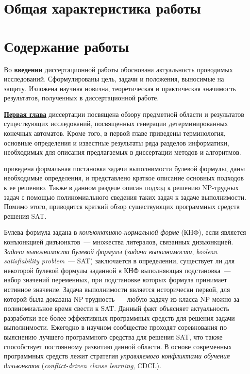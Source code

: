 
\section*{Общая характеристика работы} %



\newpage

\section*{Содержание работы}

Во \textbf{введении} диссертационной работы обоснована актуальность проводимых исследований. Сформулированы цель, задачи и положения, выносимые на защиту. Изложена научная новизна, теоретическая и практическая значимость результатов, полученных в диссертационной работе.

\textbf{\underline{Первая глава}} диссертации посвящена обзору предметной области и результатов существующих исследований, посвященных генерации детерминированных конечных автоматов.
Кроме того, в первой главе приведены терминология, основные определения и известные результаты ряда разделов информатики, необходимых для описания предлагаемых в диссертации методов и алгоритмов.

\insection{\ref{sec:review:sat}} приведена формальная постановка задачи выполнимости булевой формулы, даны необходимые определения, и представлено краткое описание основных подходов к ее решению.
Также в данном разделе описан подход к решению NP-трудных задач с помощью полиномиального сведения таких задач к задаче выполнимости.
Помимо этого, приводится краткий обзор существующих программных средств решения SAT.

Булева формула задана в \emph{конъюнктивно-нормальной форме} (КНФ), если является конъюнкцией дизъюнктов~--- множества литералов, связанных дизъюнкцией.
\emph{Задача выполнимости булевой формулы} (\emph{задача выполнимости}, \emph{boolean satisfiability problem}~{---} SAT) заключается в определении, существует ли для некоторой булевой формулы заданной в КНФ выполняющая подстановка~--- набор значений переменных, при подстановке которых формула принимает истинное значение.
Задача выполнимости является исторически первой, для которой была доказана NP-трудность~--- любую задачу из класса NP можно за полиномиальное время свести к SAT.
Данный факт объясняет актуальность разработки все более эффективных программных средств для решения задачи выполнимости.
Ежегодно в научном сообществе проходят соревнования по выяснению лучшего программного средства для решения SAT, что также способствует постоянному развитию данной области.
В основе современных программных средств лежит стратегия \emph{управляемого конфликтами обучения дизъюнктов} (\emph{conflict-driven clause learning}, CDCL).

